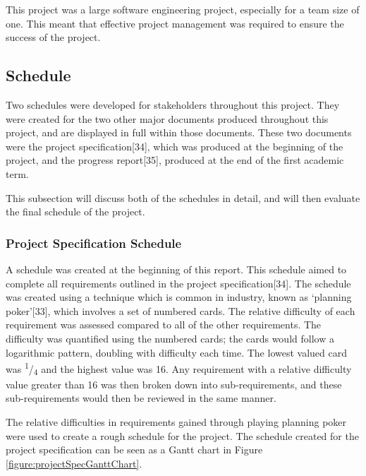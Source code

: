 \documentclass{article}
\begin{document}
This project was a large software engineering project, especially for a team size of one. This meant that effective project management was required to ensure the success of the project. \par

\subsection{Schedule}

Two schedules were developed for stakeholders throughout this project. They were created for the two other major documents produced throughout this project, and are displayed in full within those documents. These two documents were the project specification[34], which was produced at the beginning of the project, and the progress report[35], produced at the end of the first academic term. \par

This subsection will discuss both of the schedules in detail, and will then evaluate the final schedule of the project. \par

\subsubsection{Project Specification Schedule}

A schedule was created at the beginning of this report. This schedule aimed to complete all requirements outlined in the project specification[34]. The schedule was created using a technique which is common in industry, known as `planning poker'[33], which involves a set of numbered cards. The relative difficulty of each requirement was assessed compared to all of the other requirements. The difficulty was quantified using the numbered cards; the cards would follow a logarithmic pattern, doubling with difficulty each time. The lowest valued card was \textsuperscript{1}/\textsubscript{4} and the highest value was 16. Any requirement with a relative difficulty value greater than 16 was then broken down into sub-requirements, and these sub-requirements would then be reviewed in the same manner. \par

The relative difficulties in requirements gained through playing planning poker were used to create a rough schedule for the project. The schedule created for the project specification can be seen as a Gantt chart in Figure \ref{figure:projectSpecGanttChart}. \par
\end{document}
